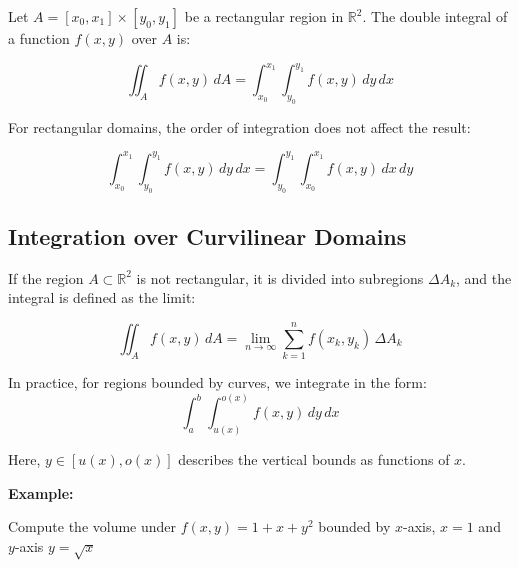 Let \( A = [x_0, x_1] \times [y_0, y_1] \) be a rectangular region in \( \mathbb{R}^2 \). The double integral of a function \( f(x, y) \) over \( A \) is:

\[
\iint_A f(x, y)\, dA = \int_{x_0}^{x_1} \int_{y_0}^{y_1} f(x, y)\, dy\, dx
\]

For rectangular domains, the order of integration does not affect the result:

\[
\int_{x_0}^{x_1} \int_{y_0}^{y_1} f(x, y)\, dy\, dx = \int_{y_0}^{y_1} \int_{x_0}^{x_1} f(x, y)\, dx\, dy
\]


\subsection{Integration over Curvilinear Domains}

If the region \( A \subset \mathbb{R}^2 \) is not rectangular, it is divided into subregions \( \Delta A_k \), and the integral is defined as the limit:

\[
\iint_A f(x, y)\, dA = \lim_{n \to \infty} \sum_{k=1}^n f(x_k, y_k) \, \Delta A_k
\]

In practice, for regions bounded by curves, we integrate in the form:
\[
\int_a^b \int_{u(x)}^{o(x)} f(x, y)\, dy\, dx
\]

Here, \( y \in [u(x), o(x)] \) describes the vertical bounds as functions of \( x \).
\vspace{\baselineskip}

\textbf{Example:}
\vspace{\baselineskip}

Compute the volume under \(f(x,y) = 1 + x + y^2\) bounded by \(x\)-axis, \(x = 1\) and \(y\)-axis \(y = \sqrt{x}\)

\begin{center}
\end{center}

